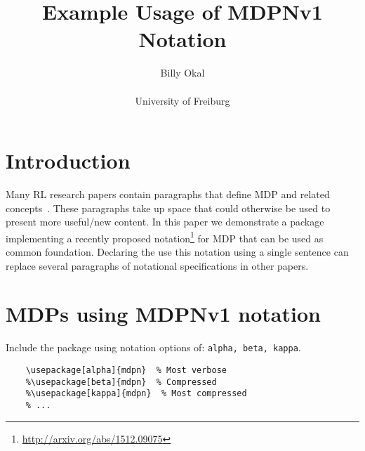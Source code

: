 \documentclass[a4paper, 11pt]{article}
\author{Billy Okal\\\\
University of Freiburg}
\title{\bf \sffamily Example Usage of MDPNv1 Notation}
\date{}
\begin{document}
\maketitle


\section{Introduction}
\label{sec:intro}
Many \gls{RL} research papers contain paragraphs that define \gls{MDP} and related concepts~\cite[see][for detailed exposition]{SuttonBarto}.
These paragraphs take up space that could otherwise be used to present more useful/new content.
In this paper we demonstrate a package implementing a recently proposed notation\footnote{\url{http://arxiv.org/abs/1512.09075}} for \gls{MDP} that can be used as common foundation. Declaring the use this notation using a single sentence can replace several paragraphs of notational specifications in other papers.

\section{MDPs using MDPNv1 notation}
\label{sec:mdps}

Include the package using notation options of: {\tt alpha, beta, kappa}.
\begin{lstlisting}[language=Tex]
    % ...
    \usepackage[alpha]{mdpn}  % Most verbose
    %\usepackage[beta]{mdpn}  % Compressed
    %\usepackage[kappa]{mdpn}  % Most compressed
    % ...
\end{lstlisting}
\end{document}
